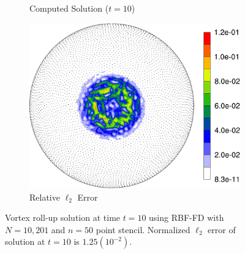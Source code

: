 \documentclass{report}
\begin{document}
\begin{figure}[ht]
\begin{center}
\begin{subfigure}[b]{0.49\textwidth}
	\caption{Computed Solution ($t=10$)}
	\label{fig:vortex_approx}
\end{subfigure} 
\begin{subfigure}[b]{0.49\textwidth}
	\centering
	\includegraphics[width=1.0\textwidth]{../figures/paper1/figures/vortex_rollup/vortexRelativeError-eps-converted-to.pdf}
	\caption{Relative $\ell_2$ Error}
	\label{fig:vortex_relerr}
\end{subfigure}
\caption{Vortex roll-up solution at time $t=10$ using RBF-FD with $N=10,201$ and $n=50$ point stencil. Normalized $\ell_2$ error of solution at $t=10$ is $1.25(10^{-2})$. }
\label{fig:vortex_t10}
\end{center}
\end{figure}
\end{document}

